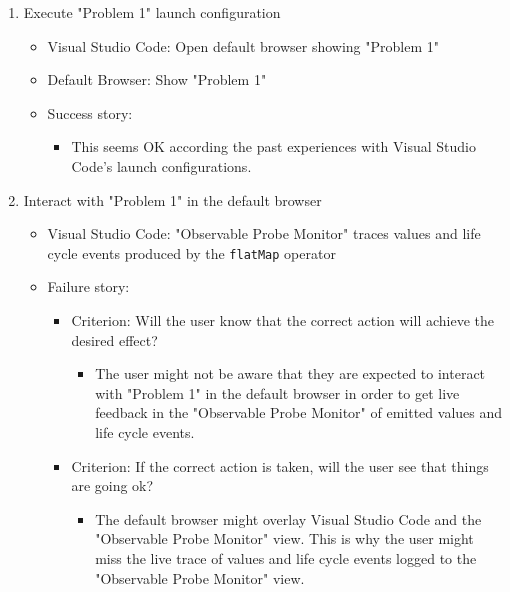 \documentclass[sigplan,screen,nonacm,review]{acmart}
\begin{document}
\begin{enumerate}
	\item Execute "Problem 1" launch configuration
	      \begin{itemize}
	      	\item Visual Studio Code: Open default browser showing "Problem 1"
	      	\item Default Browser: Show "Problem 1"
	      	\item Success story:
	      	      \begin{itemize}
	      	      	\item This seems OK according the past experiences with Visual Studio Code's launch configurations.
	      	      \end{itemize}
	      \end{itemize}

	\item Interact with "Problem 1" in the default browser
	      \begin{itemize}
	      	\item Visual Studio Code: "Observable Probe Monitor" traces values and life cycle events produced by the \texttt{flatMap} operator
	      	\item Failure story:
	      	      \begin{itemize}
	      	      	\item Criterion: Will the user know that the correct action will achieve the desired effect?
	      	      	      \begin{itemize}
	      	      	      	\item The user might not be aware that they are expected to interact with "Problem 1" in the default browser in order to get live feedback in the "Observable Probe Monitor" of emitted values and life cycle events.
	      	      	      \end{itemize}
	      	      	\item Criterion: If the correct action is taken, will the user see that things are going ok?
	      	      	      \begin{itemize}
	      	      	      	\item The default browser might overlay Visual Studio Code and the "Observable Probe Monitor" view. This is why the user might miss the live trace of values and life cycle events logged to the "Observable Probe Monitor" view.
	      	      	      \end{itemize}
	      	      \end{itemize}
	      \end{itemize}


\end{enumerate}
\end{document}
